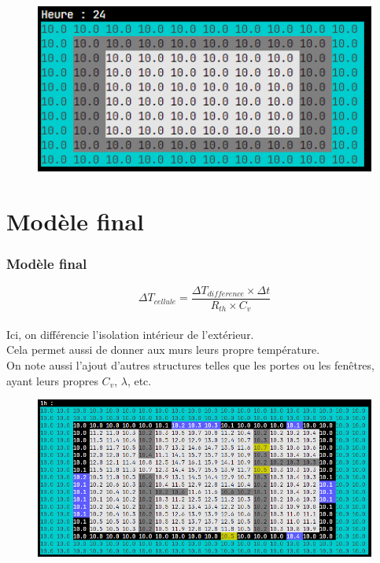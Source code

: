 \documentclass{beamer}
\begin{document}
\begin{frame}
    \begin{figure}
        \centering
        \includegraphics[width=12cm]{compilation2.png}
        \label{fig:compilation2}
    \end{figure}
\end{frame}

\section{Modèle final}
\begin{frame}
    \frametitle{Modèle final}

    \[ 
    \Delta T_{cellule} = \frac{\Delta T_{difference} \times \Delta t} {R_{th} \times C_v} 
    \]
    \\[1cm]
    Ici, on différencie l'isolation intérieur de l'extérieur.\\
    Cela permet aussi de donner aux murs leurs propre température. 
    \\[1cm]
    On note aussi l'ajout d'autres structures telles que les portes ou les fenêtres, ayant leurs propres $C_v$, $\lambda$, etc.
    
\end{frame}

\begin{frame}
    \begin{figure}
        \centering
        \includegraphics[width=12cm]{compilation3.png}
        \label{fig:compilation3}
    \end{figure}
\end{frame}
\end{document}
